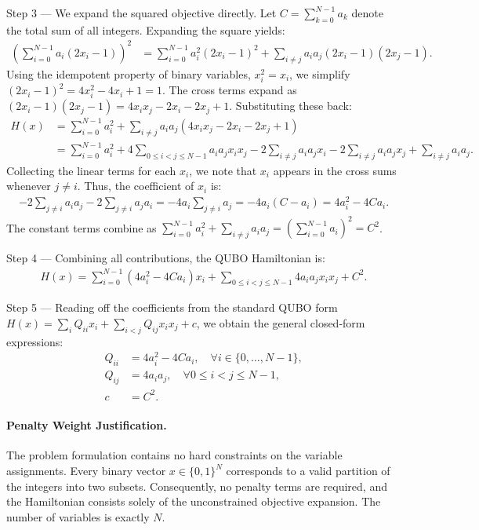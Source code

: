 \documentclass[12pt]{article}
\begin{document}
Step 3 --- We expand the squared objective directly. Let $C = \sum_{k=0}^{N-1} a_k$ denote the total sum of all integers. Expanding the square yields:
\begin{align}
    \left( \sum_{i=0}^{N-1} a_i (2x_i - 1) \right)^2 &= \sum_{i=0}^{N-1} a_i^2 (2x_i - 1)^2 + \sum_{i \neq j} a_i a_j (2x_i - 1)(2x_j - 1).
\end{align}
Using the idempotent property of binary variables, $x_i^2 = x_i$, we simplify $(2x_i - 1)^2 = 4x_i^2 - 4x_i + 1 = 1$. The cross terms expand as $(2x_i - 1)(2x_j - 1) = 4x_i x_j - 2x_i - 2x_j + 1$. Substituting these back:
\begin{align}
    H(x) &= \sum_{i=0}^{N-1} a_i^2 + \sum_{i \neq j} a_i a_j (4x_i x_j - 2x_i - 2x_j + 1) \\
         &= \sum_{i=0}^{N-1} a_i^2 + 4 \sum_{0 \leq i < j \leq N-1} a_i a_j x_i x_j - 2 \sum_{i \neq j} a_i a_j x_i - 2 \sum_{i \neq j} a_i a_j x_j + \sum_{i \neq j} a_i a_j.
\end{align}
Collecting the linear terms for each $x_i$, we note that $x_i$ appears in the cross sums whenever $j \neq i$. Thus, the coefficient of $x_i$ is:
\begin{align}
    -2 \sum_{j \neq i} a_i a_j - 2 \sum_{j \neq i} a_j a_i = -4 a_i \sum_{j \neq i} a_j = -4 a_i (C - a_i) = 4a_i^2 - 4C a_i.
\end{align}
The constant terms combine as $\sum_{i=0}^{N-1} a_i^2 + \sum_{i \neq j} a_i a_j = \left( \sum_{i=0}^{N-1} a_i \right)^2 = C^2$.

Step 4 --- Combining all contributions, the QUBO Hamiltonian is:
\begin{align}
    H(x) = \sum_{i=0}^{N-1} (4a_i^2 - 4C a_i) x_i + \sum_{0 \leq i < j \leq N-1} 4a_i a_j x_i x_j + C^2.
\end{align}

Step 5 --- Reading off the coefficients from the standard QUBO form $H(x) = \sum_{i} Q_{ii} x_i + \sum_{i < j} Q_{ij} x_i x_j + c$, we obtain the general closed-form expressions:
\begin{align}
    Q_{ii} &= 4a_i^2 - 4C a_i, \quad \forall i \in \{0, \dots, N-1\}, \\
    Q_{ij} &= 4a_i a_j, \quad \forall 0 \leq i < j \leq N-1, \\
    c &= C^2.
\end{align}

\paragraph{Penalty Weight Justification.}
The problem formulation contains no hard constraints on the variable assignments. Every binary vector $x \in \{0,1\}^N$ corresponds to a valid partition of the integers into two subsets. Consequently, no penalty terms are required, and the Hamiltonian consists solely of the unconstrained objective expansion. The number of variables is exactly $N$.
\end{document}
